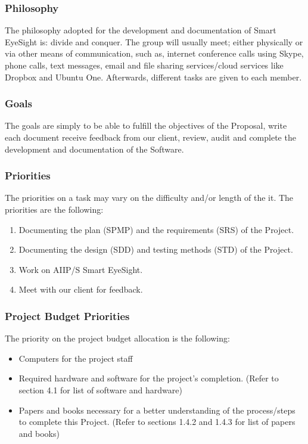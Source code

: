 \documentclass[12pt]{article}
\begin{document}
\subsubsection{Philosophy}
The philosophy adopted for the development and documentation of Smart EyeSight is: divide and conquer. The group will usually meet; either physically or via other means of communication, such as, internet conference calls using Skype, phone calls, text messages, email and file sharing services/cloud services like Dropbox and Ubuntu One. Afterwards, different tasks are given to each member.

\subsubsection{Goals}
The goals are simply to be able to fulfill the objectives of the Proposal, write each document receive feedback from our client, review, audit and complete the development and documentation of the Software.

\subsubsection{Priorities}
The priorities on a task may vary on the difficulty and/or length of the it. The priorities are the following:

\begin{enumerate}
  \item Documenting the plan (SPMP) and the requirements (SRS) of the Project.
  \item Documenting the design (SDD) and testing methods (STD) of the Project.
  \item Work on AIIP/S Smart EyeSight.
  \item Meet with our client for feedback.
\end{enumerate}

\subsubsection{Project Budget Priorities}
The priority on the project budget allocation is the following:
\begin{itemize}
  \item Computers for the project staff
  \item Required hardware and software for the project’s completion. (Refer to section 4.1 for list of software and hardware)
  \item Papers and books necessary for a better understanding of the process/steps to complete this Project. (Refer to sections 1.4.2 and 1.4.3 for list of papers and books)
\end{itemize}
\end{document}
